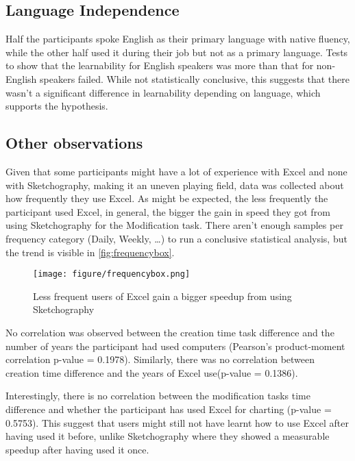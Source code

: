 \subsection{Language Independence}
Half the participants spoke English as their primary language with native fluency, while the other half used it during their job but not as a primary language. Tests to show that the learnability for English speakers was more than that for non-English speakers failed. While not statistically conclusive, this suggests that there wasn't a significant difference in learnability depending on language, which supports the hypothesis.

\subsection{Other observations}
Given that some participants might have a lot of experience with Excel and none with Sketchography, making it an uneven playing field, data was collected about how frequently they use Excel. As might be expected, the less frequently the participant used Excel, in general, the bigger the gain in speed they got from using Sketchography for the Modification task. There aren't enough samples per frequency category (Daily, Weekly, \ldots) to run a conclusive statistical analysis, but the trend is visible in \autoref{fig:frequencybox}.

\begin{figure}[H]
\begin{center}
\texttt{[image: figure/frequencybox.png]}
\end{center}
\caption{Less frequent users of Excel gain a bigger speedup from using Sketchography}
\label{fig:frequencybox}
\end{figure}


No correlation was observed between the creation time task difference and the number of years the participant had used computers (Pearson's product-moment correlation p-value = 0.1978). Similarly, there was no correlation between creation time difference and the years of Excel use(p-value = 0.1386).  

Interestingly, there is no correlation between the modification tasks time difference and whether the participant has used Excel for charting (p-value = 0.5753). This suggest that users might still not have learnt how to use Excel after having used it before, unlike Sketchography where they showed a measurable speedup after having used it once.

